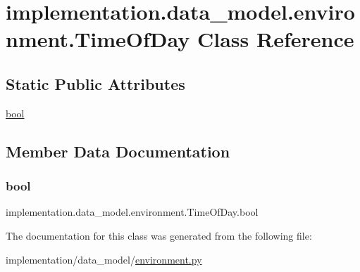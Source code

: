 \hypertarget{classimplementation_1_1data__model_1_1environment_1_1_time_of_day}{}\section{implementation.\+data\+\_\+model.\+environment.\+Time\+Of\+Day Class Reference}
\label{classimplementation_1_1data__model_1_1environment_1_1_time_of_day}
\subsection*{Static Public Attributes}
\begin{DoxyCompactItemize}
\item 
\hyperlink{classimplementation_1_1data__model_1_1environment_1_1_time_of_day_a674b9c8933e6386ccb97c676a2c498b0}{bool}
\end{DoxyCompactItemize}


\subsection{Member Data Documentation}
\mbox{\label{classimplementation_1_1data__model_1_1environment_1_1_time_of_day_a674b9c8933e6386ccb97c676a2c498b0}} 
\subsubsection{\texorpdfstring{bool}{bool}}
{\footnotesize\ttfamily implementation.\+data\+\_\+model.\+environment.\+Time\+Of\+Day.\+bool\hspace{0.3cm}{\ttfamily [static]}}



The documentation for this class was generated from the following file\+:\begin{DoxyCompactItemize}
\item 
implementation/data\+\_\+model/\hyperlink{environment_8py}{environment.\+py}\end{DoxyCompactItemize}
